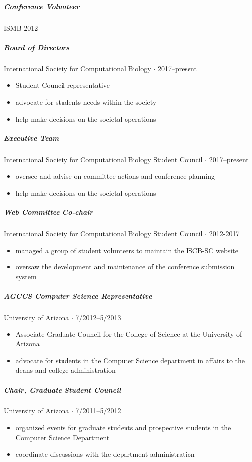 \documentclass[10pt,letterpaper]{article}
\begin{document}
\subparagraph{Conference Volunteer}
ISMB 2012

\subparagraph{Board of Directors}
International Society for Computational Biology  $\cdot$ 2017--present
\begin{itemize}
    \item Student Council representative 
    \item advocate for students needs within the society
    \item help make decisions on the societal operations
\end{itemize}

\subparagraph{Executive Team}
International Society for Computational Biology Student Council $\cdot$ 2017--present
\begin{itemize} 
    \item oversee and advise on committee actions and conference planning 
    \item help make decisions on the societal operations
\end{itemize}

\subparagraph{Web Committee Co-chair}
International Society for Computational Biology Student Council  $\cdot$ 2012-2017
\begin{itemize}
    \item managed a group of student volunteers to maintain the ISCB-SC website
    \item oversaw the development and maintenance of the conference submission system
\end{itemize}

\subparagraph{AGCCS Computer Science Representative}
University of Arizona $\cdot$ 7/2012--5/2013
\begin{itemize}
    \item Associate Graduate Council for the College of Science at the University of Arizona
    \item advocate for students in the Computer Science department in affairs to the deans and college administration
\end{itemize}

\subparagraph{Chair, Graduate Student Council}
University of Arizona $\cdot$ 7/2011--5/2012
\begin{itemize}
    \item organized events for graduate students and prospective students in the Computer Science Department
    \item coordinate discussions with the department administration
\end{itemize}
\end{document}
